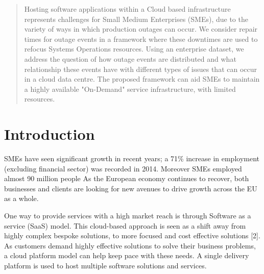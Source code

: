 \documentclass[conference]{IEEEtran}
\begin{document}
\begin{abstract}

Hosting software applications within a Cloud based infrastructure represents challenges for Small Medium Enterprises (SMEs), due to the variety of ways in which production outages can occur. We consider repair times for outage events in a framework where these downtimes are used to refocus Systems Operations resources. Using an enterprise dataset, we address the question of how outage events are distributed and what relationship these events have with different types of issues that can occur in a cloud data centre. The proposed framework can aid SMEs to maintain a highly available "On-Demand" service infrastructure, with limited resources.
\end{abstract}


%
\IEEEpeerreviewmaketitle

\section{Introduction}

SMEs have seen significant growth in recent years; a 71\% increase in employment (excluding financial sector) was recorded in 2014. Moreover SMEs employed almost 90 million people \cite{europa2015sme} As the European economy continues to recover, both businesses and clients are looking for new avenues to drive growth across the EU as a whole. \par

One way to provide services with a high market reach is through Software as a service (SaaS) model. This cloud-based approach is seen as a shift away from highly complex bespoke solutions, to more focused and cost effective solutions [2]. As customers demand highly effective solutions to solve their business problems, a cloud platform model can help keep pace with these needs. A single delivery platform is used to host multiple software solutions and services. \par
\end{document}
